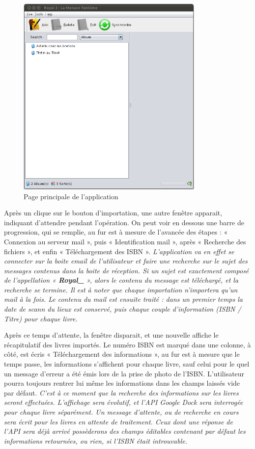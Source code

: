 \begin{figure}
\begin{center}
\includegraphics[height=10cm]{../img/principaleModifiee.png}
\end{center}
\caption{Page principale de l'application}
\end{figure}

Après un clique sur le bouton d'importation, 
une autre fenêtre apparait, indiquant d'attendre pendant l'opération. 
On peut voir en dessous une barre de progression, qui se remplie, au fur est à mesure de l'avancée des étapes : 
« Connexion au serveur mail », puis « Identification mail », après « Recherche des fichiers », et enfin « Téléchargement des ISBN ».
\emph{L'application va en effet se connecter sur la boite email de l'utilisateur et faire une recherche sur le sujet des messages contenus dans la boite de réception.
	Si un sujet est exactement composé de l'appellation « \textbf{Royal\_} », alors le contenu du message est téléchargé, et la recherche se termine.
	Il est à noter que chaque importation n'importera qu'un mail à la fois. 
	Le contenu du mail est ensuite traité : dans un premier temps la date de scann du lieux est conservé, puis chaque couple d'information (ISBN \slash{} Titre) pour chaque livre. 
}

Après ce temps d'attente, la fenêtre disparait, et une nouvelle affiche le récapitulatif des livres importés.
Le numéro ISBN est marqué dans une colonne, à côté, est écris « Téléchargement des informations », au fur est à mesure que le temps passe, les informations s'affichent pour chaque livre, sauf celui pour le quel un message d'erreur a été émis lors de la prise de photo de l'ISBN. 
L'utilisateur pourra toujours rentrer lui même les informations dans les champs laissés vide par défaut. 
\emph{C'est à ce moment que la recherche des informations sur les livres seront effectuées. 
	L'affichage sera évolutif, et l'API Google Dock sera interrogée pour chaque livre séparément. 
	Un message d'attente, ou de recherche en cours sera écrit pour les livres en attente de traitement. 
	Ceux dont une réponse de l'API sera déjà arrivé possèderons des champs éditables contenant par défaut les informations retournées, ou rien, si l'ISBN était introuvable. 
}

